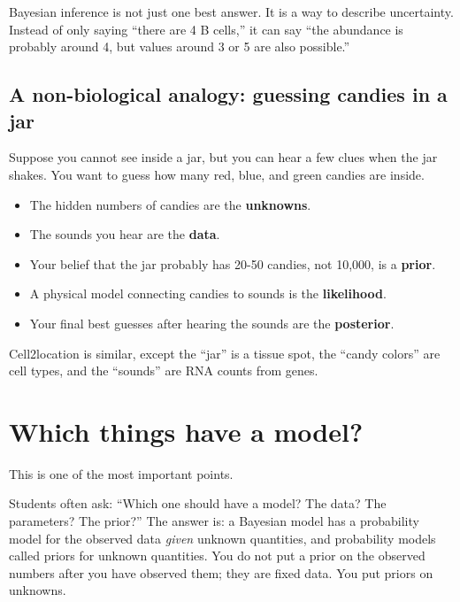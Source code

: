 \documentclass[11pt]{article}
\newcommand{\term}[1]{\textbf{#1}}
\begin{document}
\begin{bigidea}
Bayesian inference is not just one best answer. It is a way to describe uncertainty. Instead of only saying ``there are 4 B cells,'' it can say ``the abundance is probably around 4, but values around 3 or 5 are also possible.''
\end{bigidea}

\subsection{A non-biological analogy: guessing candies in a jar}

Suppose you cannot see inside a jar, but you can hear a few clues when the jar shakes. You want to guess how many red, blue, and green candies are inside.

\begin{itemize}
  \item The hidden numbers of candies are the \term{unknowns}.
  \item The sounds you hear are the \term{data}.
  \item Your belief that the jar probably has 20-50 candies, not 10,000, is a \term{prior}.
  \item A physical model connecting candies to sounds is the \term{likelihood}.
  \item Your final best guesses after hearing the sounds are the \term{posterior}.
\end{itemize}

Cell2location is similar, except the ``jar'' is a tissue spot, the ``candy colors'' are cell types, and the ``sounds'' are RNA counts from genes.

\section{Which things have a model?}

This is one of the most important points.

\begin{warningbox}
Students often ask: ``Which one should have a model? The data? The parameters? The prior?'' The answer is: a Bayesian model has a probability model for the observed data \emph{given} unknown quantities, and probability models called priors for unknown quantities. You do not put a prior on the observed numbers after you have observed them; they are fixed data. You put priors on unknowns.
\end{warningbox}
\end{document}
